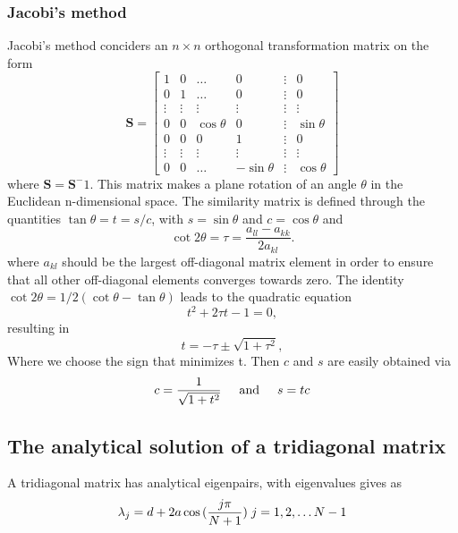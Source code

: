 \documentclass[%
reprint,
amsmath,amssymb,
aps,
]{revtex4-1}
\begin{document}
\subsubsection*{Jacobi's method}  \noindent 
Jacobi's method conciders an $n\times n$ orthogonal transformation matrix on the form 
\begin{equation*}
\mathbf{S} = \begin{bmatrix}
1 & 0  & \dots & 0 &\vdots &0 \\
0 & 1  & \dots & 0 & \vdots & 0 \\
\vdots & \vdots &\vdots&\vdots&\vdots&\vdots\\
0 & 0 & \cos{\theta} & 0 &\vdots & \sin{\theta} \\
0  & 0 & 0 & 1 &\vdots & 0 \\
 \vdots & \vdots &\vdots&\vdots&\vdots&\vdots\\
 0 & 0 &\dots & -\sin{\theta} & \vdots & \cos{\theta}
\end{bmatrix}
\end{equation*}
where $\mathbf{S} = \mathbf{S}^-1$. This matrix makes a plane rotation of an angle $\theta$ in the Euclidean n-dimensional space. The similarity matrix is defined through the quantities $\tan\theta = t= s/c$, with $s=\sin\theta$ and $c=\cos\theta$ and
\begin{equation*}\cot 2\theta=\tau = \frac{a_{ll}-a_{kk}}{2a_{kl}}.
\end{equation*}
where $a_{kl}$ should be the largest off-diagonal matrix element in order to ensure that all other off-diagonal elements converges towards zero. The identity $\cot 2\theta=1/2(\cot \theta-\tan\theta)$ leads to the quadratic equation
\begin{equation*}
t^2+2\tau t-1= 0,
\end{equation*}
resulting in
\begin{equation*}
t = -\tau \pm \sqrt{1+\tau^2},
\end{equation*}
Where we choose the sign that minimizes t. Then $c$ and $s$ are easily obtained via
\begin{equation}\label{sc}
c = \frac{1}{\sqrt{1+t^2}} \hspace{5mm}  \textnormal{and} \hspace{5mm} s=tc
\end{equation}  

\subsection{The analytical solution of a tridiagonal matrix}
A tridiagonal matrix has analytical eigenpairs, with eigenvalues gives as 
\begin{equation}\label{analytical}
	\lambda_j = d+2a\cos{(\frac{j\pi}{N+1})} \hspace{0.1cm} j=1,2,\dots N-1
\end{equation}
\end{document}
